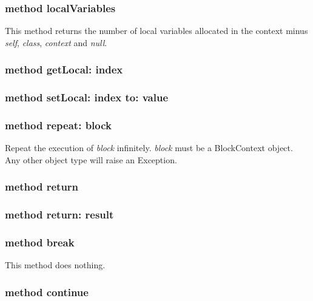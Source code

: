 \subsubsection {method localVariables}
This method returns the number of local variables allocated in the context
minus \textit{self}, \textit{class}, \textit{context} and \textit{null}.

\subsubsection {method getLocal: index}

\subsubsection {method setLocal: index to: value}

\subsubsection {method repeat: block}
Repeat the execution of \textit{block} infinitely. \textit{block} must be
a BlockContext object. Any other object type will raise an Exception.

\subsubsection {method return}

\subsubsection {method return: result}

\subsubsection{method break}
This method does nothing.

\subsubsection{method continue}

